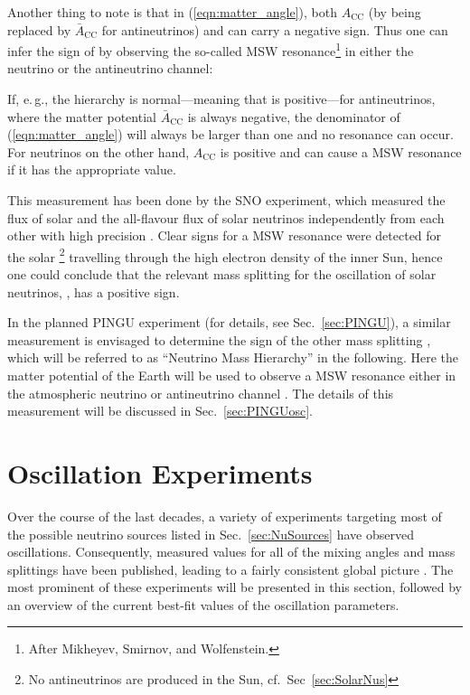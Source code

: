 Another thing to note is that in (\ref{eqn:matter_angle}), both $A_\mathrm{CC}$ 
(by being replaced by $\bar{A}_\mathrm{CC}$ for antineutrinos)
and \dm{} can carry a negative sign. Thus one can infer the sign of \dm{} by
observing the so-called MSW resonance\footnote{After Mikheyev, Smirnov, and
Wolfenstein.} in either the neutrino or the antineutrino channel:

If, e.\,g., the hierarchy is normal---meaning that \dm{} is positive---for 
antineutrinos, where the matter potential $\bar{A}_\mathrm{CC}$ is always 
negative, the denominator of (\ref{eqn:matter_angle}) will always be larger 
than one and no resonance can occur. For neutrinos on the other hand, 
$A_\mathrm{CC}$ is positive and can cause a MSW resonance if it has the 
appropriate value.

This measurement has been
done by the SNO experiment, which measured the flux of solar \nue and the
all-flavour flux of solar neutrinos independently from each other with high
precision \cite{SNOosc}. Clear signs for a MSW resonance were detected for the
solar \nue\footnote{No antineutrinos are produced in the Sun, cf.\
Sec~\ref{sec:SolarNus}} travelling through the high electron density of the
inner Sun, hence one could conclude that the relevant mass splitting for
the oscillation of solar neutrinos, \dm{21}, has a positive sign.

In the planned PINGU experiment (for details, see Sec.~\ref{sec:PINGU}), a
similar measurement is envisaged to determine the sign of the other mass
splitting \dm{31}, which will be referred to as ``Neutrino Mass Hierarchy'' in
the following. Here the matter potential of the Earth will be used to
observe a MSW resonance either in the atmospheric neutrino or antineutrino
channel \cite{Akhmedov, LoI}. The details of this measurement will be discussed
in Sec.~\ref{sec:PINGUosc}.




\section{Oscillation Experiments}
\label{sec:OscExp}

Over the course of the last decades, a variety of experiments targeting most of
the possible neutrino sources listed in Sec.~\ref{sec:NuSources} have observed
oscillations. Consequently, measured values for all of the mixing angles and
mass splittings have been published, leading to a fairly consistent global
picture \cite{Fogli,GonzalezGarcia}. The most prominent of these experiments 
will be presented in this section, followed by an overview of the current 
best-fit values of the oscillation parameters.


